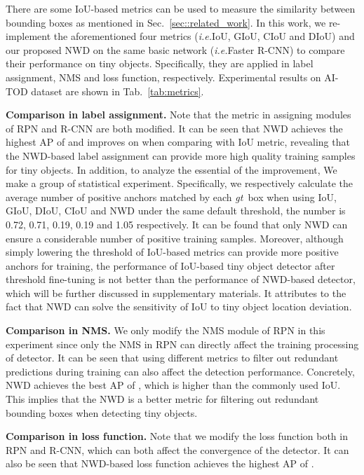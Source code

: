 \documentclass{article}
\newcommand{\ie}{\textit{i.e.}}
\newcommand{\gt}{\textit{gt}~}
\begin{document}
There are some IoU-based metrics can be used to measure the similarity between bounding boxes as mentioned in Sec.~\ref{sec::related_work}. In this work, we re-implement the aforementioned four metrics (\ie IoU, GIoU, CIoU and DIoU) and our proposed NWD on the same basic network (\ie Faster R-CNN) to compare their performance on tiny objects. Specifically, they are applied in label assignment, NMS and loss function, respectively. Experimental results on AI-TOD dataset are shown in Tab.~\ref{tab:metrics}.

\textbf{Comparison in label assignment.} Note that the metric in assigning modules of RPN and R-CNN are both modified. It can be seen that NWD achieves the highest AP of  and improves  on  when comparing with IoU metric, revealing that the NWD-based label assignment can provide more high quality training samples for tiny objects. In addition, to analyze the essential of the improvement, We make a group of statistical experiment. Specifically, we respectively calculate the average number of positive anchors matched by each \gt box when using IoU, GIoU, DIoU, CIoU and NWD under the same default threshold, the number is 0.72, 0.71, 0.19, 0.19 and 1.05 respectively. It can be found that only NWD can ensure a considerable number of positive training samples. Moreover, although simply lowering the threshold of IoU-based metrics can provide more positive anchors for training, the performance of IoU-based tiny object detector after threshold fine-tuning is not better than the performance of NWD-based detector, which will be further discussed in supplementary materials. It attributes to the fact that NWD can solve the sensitivity of IoU to tiny object location deviation.

\textbf{Comparison in NMS.} We only modify the NMS module of RPN in this experiment since only the NMS in RPN can directly affect the training processing of detector. It can be seen that using different metrics to filter out redundant predictions during training can also affect the detection performance. Concretely, NWD achieves the best AP of , which is  higher than the commonly used IoU. This implies that the NWD is a better metric for filtering out redundant bounding boxes when detecting tiny objects.

\textbf{Comparison in loss function.} Note that we modify the loss function both in RPN and R-CNN, which can both affect the convergence of the detector. It can also be seen that NWD-based loss function achieves the highest AP of . 
\end{document}
